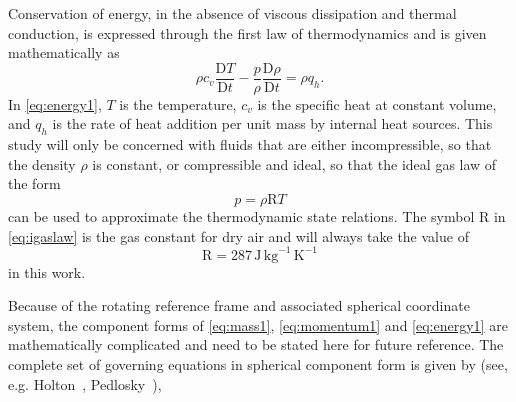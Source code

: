 Conservation of energy, in the absence of viscous dissipation and thermal conduction, is expressed through the first law of thermodynamics and is given mathematically as
\begin{equation}
   \rho c_v \frac{\mathrm{D} T }{\mathrm{D} t}-\frac{p}{\rho}\frac{\mathrm{D}\rho}{\mathrm{D} t}= \rho q_h.
  \label{eq:energy1}
\end{equation}
In \eqref{eq:energy1}, $T$ is the temperature, $c_v$ is the specific heat at constant volume, and $q_h$ is the rate of heat addition per unit mass by internal heat sources. This study will only be concerned with fluids that are either incompressible, so that the density $\rho$ is constant, or compressible and ideal, so that the ideal gas law of the form
\begin{equation}
	p = \rho \mathrm{R} T
\label{eq:igaslaw}
\end{equation}
can be used to approximate the thermodynamic state relations. The symbol $\mathrm{R}$ in \eqref{eq:igaslaw} is the gas constant for dry air and will always take the value of
\begin{equation*}
\mathrm{R}=287\,\text{J}\,\text{kg}^{-1}\,\text{K}^{-1}
\end{equation*}
in this work.

Because of the rotating reference frame and associated spherical coordinate system, the component forms of \eqref{eq:mass1}, \eqref{eq:momentum1} and \eqref{eq:energy1} are mathematically complicated and need to be stated here for future reference. The complete set of governing equations in spherical component form is given by (see, e.g. Holton~\cite[pages 24--28]{Holton:IDM}, Pedlosky~\cite[pages 314--317]{Pedlosky:GFD}),


